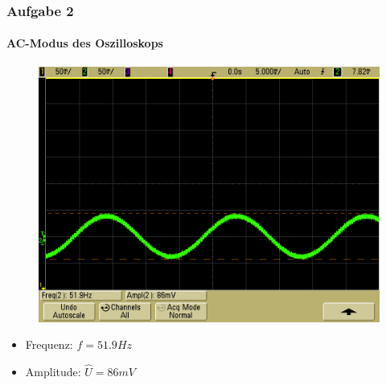\begin{frame}
    \frametitle{Aufgabe 2}
    \framesubtitle{AC-Modus des Oszilloskops}
     \begin{figure}[H]
     \begin{center}
             \includegraphics[scale=0.2]{./img/2c_Testsignal_mit_Hochpassfilter.png}
     \end{center}
     \end{figure}
     \begin{itemize}
        \item Frequenz: $f=51.9Hz$
        \item Amplitude: $\hat{U} = 86mV$
     \end{itemize}
\end{frame}

